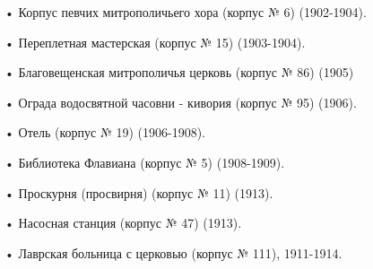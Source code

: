 \noindent • Корпус певчих митрополичьего хора (корпус № 6) (1902-1904).

\noindent • Переплетная мастерская (корпус № 15) (1903-1904).

\noindent • Благовещенская митрополичья церковь (корпус № 86) (1905)

\noindent • Ограда водосвятной часовни - кивория (корпус № 95) (1906).

\noindent • Отель (корпус № 19) (1906-1908).

\noindent • Библиотека Флавиана (корпус № 5) (1908-1909).

\noindent • Проскурня (просвирня) (корпус № 11) (1913).

\noindent • Насосная станция (корпус № 47) (1913).

\noindent • Лаврская больница с церковью (корпус № 111), 1911-1914.

